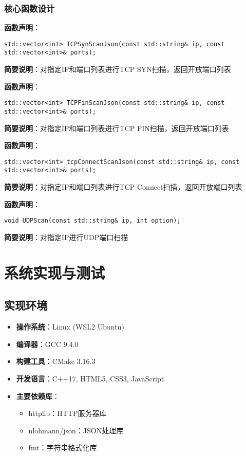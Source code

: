 \documentclass[12pt,hyperref,a4paper,UTF8]{ctexart}
\begin{document}
\subsubsection{核心函数设计}

\textbf{函数声明}：
\begin{verbatim}
std::vector<int> TCPSynScanJson(const std::string& ip, const std::vector<int>& ports);
\end{verbatim}
\textbf{简要说明}：对指定IP和端口列表进行TCP SYN扫描，返回开放端口列表

\textbf{函数声明}：
\begin{verbatim}
std::vector<int> TCPFinScanJson(const std::string& ip, const std::vector<int>& ports);
\end{verbatim}
\textbf{简要说明}：对指定IP和端口列表进行TCP FIN扫描，返回开放端口列表

\textbf{函数声明}：
\begin{verbatim}
std::vector<int> tcpConnectScanJson(const std::string& ip, const std::vector<int>& ports);
\end{verbatim}
\textbf{简要说明}：对指定IP和端口列表进行TCP Connect扫描，返回开放端口列表

\textbf{函数声明}：
\begin{verbatim}
void UDPScan(const std::string& ip, int option);
\end{verbatim}
\textbf{简要说明}：对指定IP进行UDP端口扫描

\section{系统实现与测试}

\subsection{实现环境}
\begin{itemize}
    \item \textbf{操作系统}：Linux (WSL2 Ubuntu)
    \item \textbf{编译器}：GCC 9.4.0
    \item \textbf{构建工具}：CMake 3.16.3
    \item \textbf{开发语言}：C++17, HTML5, CSS3, JavaScript
    \item \textbf{主要依赖库}：
    \begin{itemize}
        \item httplib：HTTP服务器库
        \item nlohmann/json：JSON处理库
        \item fmt：字符串格式化库
    \end{itemize}
\end{itemize}
\end{document}
